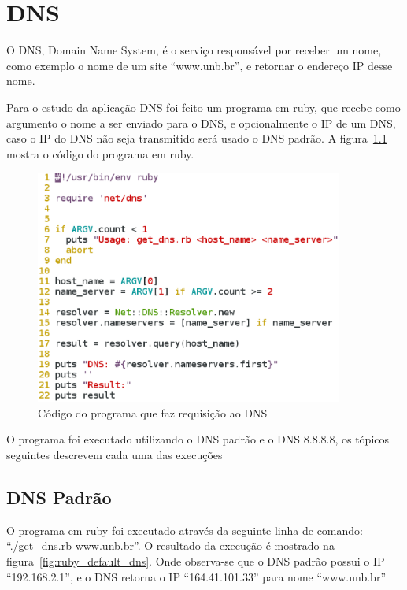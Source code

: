 \chapter{DNS}

O DNS, Domain Name System, é o serviço responsável por receber um nome, como
exemplo o nome de um site “www.unb.br”, e retornar o endereço IP desse
nome.

Para o estudo da aplicação DNS foi feito um programa em ruby, que recebe como
argumento o nome a ser enviado para o DNS, e opcionalmente o IP de um DNS, caso
o IP do DNS não seja transmitido será usado o DNS padrão. A figura~\ref{fig:ruby_get_dns}
mostra o código do programa em ruby.

\begin{figure}[h]
  \centering
  \includegraphics[width=0.9\textwidth]{figuras/ruby_get_dns.eps}
  \caption{Código do programa que faz requisição ao DNS}
  \label{fig:ruby_get_dns}
\end{figure}

O programa foi executado utilizando o DNS padrão e o DNS 8.8.8.8, os tópicos
seguintes descrevem cada uma das execuções

\section{DNS Padrão}

O programa em ruby foi executado através da seguinte linha de comando:
“./get{\_}dns.rb www.unb.br”. O resultado da execução é mostrado na
figura~\ref{fig:ruby_default_dns}. Onde observa-se que o DNS padrão possui
o IP “192.168.2.1”, e o DNS retorna o IP “164.41.101.33” para nome “www.unb.br”

